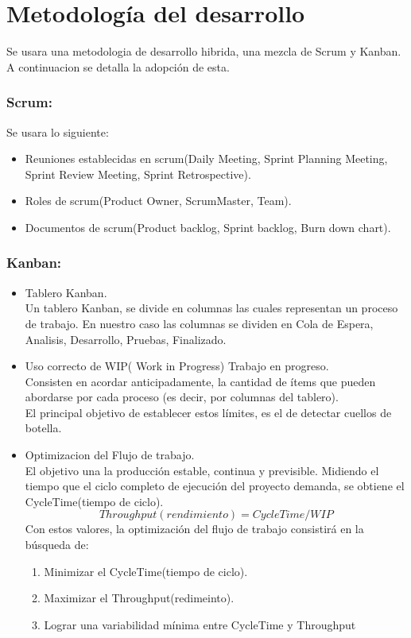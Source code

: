 \documentclass[11pt,letterpaper]{report}
\begin{document}
\section{Metodología del desarrollo}
Se usara una metodologia de desarrollo hibrida, una mezcla de Scrum y Kanban.\\
A continuacion se detalla la adopción de esta.
\subsubsection{Scrum:} 
Se usara lo siguiente:
\begin{itemize}
	\item Reuniones establecidas en scrum(Daily Meeting, Sprint Planning Meeting, Sprint Review Meeting, Sprint Retrospective).
	\item Roles de scrum(Product Owner, ScrumMaster, Team).
	\item Documentos de scrum(Product backlog, Sprint backlog, Burn down chart).
\end{itemize}
\subsubsection{Kanban:} 
\begin{itemize}
	\item Tablero Kanban.\\
	Un tablero Kanban, se divide en columnas las cuales representan un proceso de trabajo. En nuestro caso las columnas se dividen en Cola de Espera, Analisis, Desarrollo, Pruebas, Finalizado.
	\item Uso correcto de WIP( Work in Progress) Trabajo en progreso.\\
	Consisten en acordar anticipadamente, la cantidad de ítems que pueden abordarse por cada proceso (es decir, por columnas del tablero).\\
	El principal objetivo de establecer estos límites, es el de detectar cuellos de botella. 
	\item Optimizacion del Flujo de trabajo.\\
	El objetivo una la producción estable, continua y previsible. Midiendo el tiempo que el ciclo completo de ejecución del proyecto demanda, se obtiene el CycleTime(tiempo de ciclo).
	\begin{equation}
	Throughput(rendimiento) = CycleTime/WIP
	\end{equation}
	Con estos valores, la optimización del flujo de trabajo consistirá en la búsqueda de:
	\begin{enumerate}
		\item Minimizar el CycleTime(tiempo de ciclo).
		\item Maximizar el Throughput(redimeinto).
		\item Lograr una variabilidad mínima entre CycleTime y Throughput
	\end{enumerate}
\end{itemize}
\end{document}
